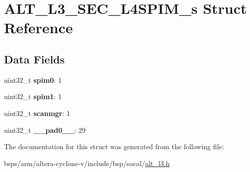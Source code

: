 \hypertarget{structALT__L3__SEC__L4SPIM__s}{}\section{A\+L\+T\+\_\+\+L3\+\_\+\+S\+E\+C\+\_\+\+L4\+S\+P\+I\+M\+\_\+s Struct Reference}
\label{structALT__L3__SEC__L4SPIM__s}
\subsection*{Data Fields}
\begin{DoxyCompactItemize}
\item 
\mbox{\label{structALT__L3__SEC__L4SPIM__s_aaa86ab7a369adb4eb0848dadb2992ef7}} 
uint32\+\_\+t {\bfseries spim0}\+: 1
\item 
\mbox{\label{structALT__L3__SEC__L4SPIM__s_a174fc7c3142ef42f0878afcde062b6ba}} 
uint32\+\_\+t {\bfseries spim1}\+: 1
\item 
\mbox{\label{structALT__L3__SEC__L4SPIM__s_a272bb2e5ad2403e645d13fdec054bb0d}} 
uint32\+\_\+t {\bfseries scanmgr}\+: 1
\item 
\mbox{\label{structALT__L3__SEC__L4SPIM__s_a9752143ec89a5450e9c02e3146cabca3}} 
uint32\+\_\+t {\bfseries \+\_\+\+\_\+pad0\+\_\+\+\_\+}\+: 29
\end{DoxyCompactItemize}


The documentation for this struct was generated from the following file\+:\begin{DoxyCompactItemize}
\item 
bsps/arm/altera-\/cyclone-\/v/include/bsp/socal/\mbox{\hyperlink{alt__l3_8h}{alt\+\_\+l3.\+h}}\end{DoxyCompactItemize}
